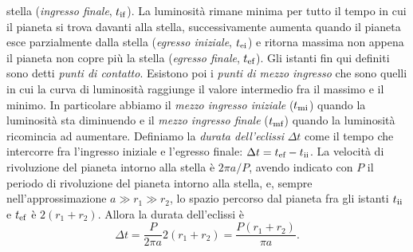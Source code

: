 stella (\emph{ingresso finale}, $t_{\textup{if}}$). La luminosità rimane minima
per tutto il tempo in cui il pianeta si trova davanti alla stella,
successivamente aumenta quando il pianeta esce parzialmente dalla stella
(\emph{egresso iniziale}, $t_{\textup{ei}}$) e ritorna massima non appena il
pianeta non copre più la stella (\emph{egresso finale}, $t_{\textup{ef}}$). Gli
istanti fin qui definiti sono detti \emph{punti di contatto}. Esistono poi i
\emph{punti di mezzo ingresso} che sono quelli in cui la curva di luminosità
raggiunge il valore intermedio fra il massimo e il minimo. In particolare
abbiamo il \emph{mezzo ingresso iniziale} ($t_{\textup{mi}}$) quando la
luminosità sta diminuendo e il \emph{mezzo ingresso finale} ($t_{\textup{mf}}$)
quando la luminosità ricomincia ad aumentare. Definiamo la
\emph{durata dell'eclissi} $\Delta t$ come il tempo che intercorre fra
l'ingresso iniziale e l'egresso finale:
$\Delta t = t_{\textup{ef}} - t_{\textup{ii}}$. La velocità di rivoluzione del
pianeta intorno alla stella è $2\pi a/P$, avendo indicato con $P$ il periodo
di rivoluzione del pianeta intorno alla stella, e, sempre nell'approssimazione
$a \gg r_1 \gg r_2$, lo spazio percorso dal pianeta fra gli istanti
$t_{\textup{ii}}$ e $t_{\textup{ef}}$ è $2(r_1 + r_2)$. Allora la durata
dell'eclissi è
\begin{equation}
  \Delta t = \frac{P}{2\pi a}2(r_1 + r_2) = \frac{P(r_1 + r_2)}{\pi a}.
\end{equation}

